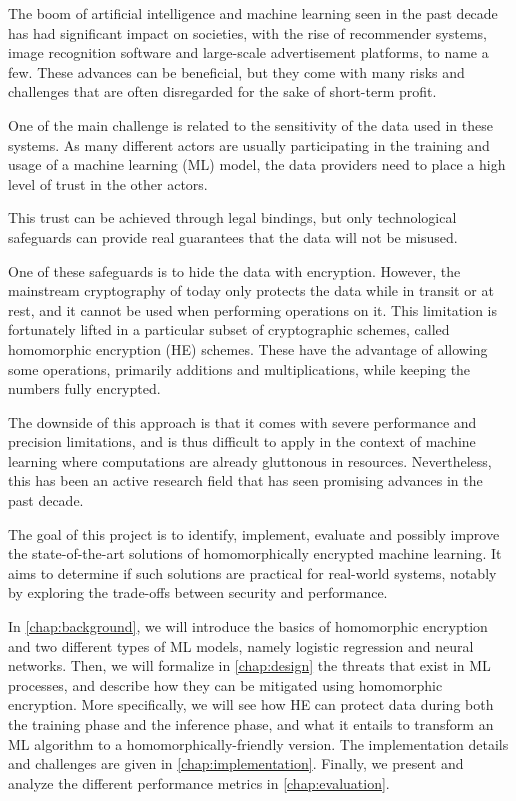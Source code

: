 \documentclass[a4paper,11pt,oneside]{report}
\begin{document}

The boom of artificial intelligence and machine learning seen in the past decade has had significant impact on societies, with the rise of recommender systems, image recognition software and large-scale advertisement platforms, to name a few. 
These advances can be beneficial, but they come with many risks and challenges that are often disregarded for the sake of short-term profit.

One of the main challenge is related to the sensitivity of the data used in these systems. 
As many different actors are usually participating in the training and usage of a machine learning (ML) model, the data providers need to place a high level of trust in the other actors.

This trust can be achieved through legal bindings, but only technological safeguards can provide real guarantees that the data will not be misused.

One of these safeguards is to hide the data with encryption. 
However, the mainstream cryptography of today only protects the data while in transit or at rest, and it cannot be used when performing operations on it. 
This limitation is fortunately lifted in a particular subset of cryptographic schemes, called homomorphic encryption (HE) schemes. 
These have the advantage of allowing some operations, primarily additions and multiplications, while keeping the numbers fully encrypted.

The downside of this approach is that it comes with severe performance and precision limitations, and is thus difficult to apply in the context of machine learning where computations are already gluttonous in resources. 
Nevertheless, this has been an active research field that has seen promising advances in the past decade.

The goal of this project is to identify, implement, evaluate and possibly improve the state-of-the-art solutions of homomorphically encrypted machine learning. It aims to determine if such solutions are practical for real-world systems, notably by exploring the trade-offs between security and performance.

In \autoref{chap:background}, we will introduce the basics of homomorphic encryption and two different types of ML models, namely logistic regression and neural networks. 
Then, we will formalize in \autoref{chap:design} the threats that exist in ML processes, and describe how they can be mitigated using homomorphic encryption.
More specifically, we will see how HE can protect data during both the training phase and the inference phase, and what it entails to transform an ML algorithm to a homomorphically-friendly version.
The implementation details and challenges are given in \autoref{chap:implementation}.
Finally, we present and analyze the different performance metrics in \autoref{chap:evaluation}.
\end{document}
